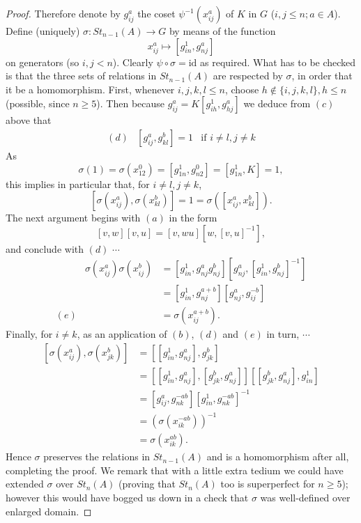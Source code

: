 \documentclass[openany,leqno]{book}  %
\newcommand{\id}{\mathrm{id}} %
\begin{document}
\begin{proof}
Therefore denote by $g_{ij}^a$ the coset $\psi^{-1}(x_{ij}^a)$ of $K$ in $G$ ($i,j\leqslant n; a\in A$). Define (uniquely) $\sigma\colon   St_{n-1}(A)\rightarrow G$ by means of the function
\[x_{ij}^a \mapsto [g_{in}^1,g_{nj}^a]\]
on generators (so $i,j<n$). Clearly $\psi \circ \sigma =\id$ as required. What has to be checked is that the three sets of relations in $St_{n-1}(A)$ are respected by $\sigma$, in order that it be a homomorphism. First, whenever $i,j,k,l\leqslant n$, choose $h\notin \{i,j,k,l\}, h\leqslant n$ (possible, since $n\geqslant 5$). Then because $g_{ij}^a=K[g_{ih}^1,g_{hj}^a]$ we deduce from $(c)$ above that 
\begin{equation*}
\begin{array}{rcr}
(d) &[g_{ij}^a,g_{kl}^b]=1 & \text{if } i\neq l, j\neq k
\end{array}
\end{equation*}
As
\[\sigma(1)=\sigma(x_{12}^0)=[g_{1n}^1,g_{n2}^0]=[g_{1n}^1,K]=1,\]
this implies in particular that, for $i\neq l, j\neq k$,
\[[\sigma(x_{ij}^a),\sigma(x_{kl}^b)]=1=\sigma([x_{ij}^a,x_{kl}^b]).\]
The next argument begins with $(a)$ in the form
\[[v,w][v,u]=[v,wu][w,[v,u]^{-1}],\]
and conclude with $(d)$ $\cdots$
\begin{equation*}
\begin{array}{rrl}
 &\sigma(x_{ij}^a)\sigma(x_{ij}^b)&=[g_{in}^1,g_{nj}^ag_{nj}^b][g_{nj}^a,[g_{in}^1,g_{nj}^b]^{-1}] \\
 & &=[g_{in}^1,g_{nj}^{a+b}][g_{nj}^a,g_{ij}^{-b}]\\
 (e)& &=\sigma(x_{ij}^{a+b}). 
\end{array}
\end{equation*}
Finally, for $i\neq k$, as an application of $(b)$, $(d)$ and $(e)$ in turn, $\cdots$
\begin{equation*}
\begin{array}{rl}
[\sigma(x_{ij}^a),\sigma(x_{jk}^b)] & =[[g_{in}^1,g_{nj}^a],g_{jk}^b]\\
& =[[g_{in}^1,g_{nj}^a],[g_{jk}^b,g_{nj}^a]][[g_{jk}^b,g_{nj}^a],g_{in}^1]\\
& =[g_{ij}^a,g_{nk}^{-ab}][g_{in}^1,g_{nk}^{-ab}]^{-1}\\
& =(\sigma(x_{ik}^{-ab}))^{-1}\\
& =\sigma(x_{ik}^{ab}).
\end{array}
\end{equation*}
Hence $\sigma$ preserves the relations in $St_{n-1}(A)$ and is a homomorphism after all, completing the proof. We remark that with a little extra tedium we could have extended $\sigma$ over $St_n(A)$ (proving that $St_n(A)$ too is superperfect for $n\geqslant 5$); however this would have bogged us down in a check that $\sigma$ was well-defined over enlarged domain.
\end{proof}
\end{document}
